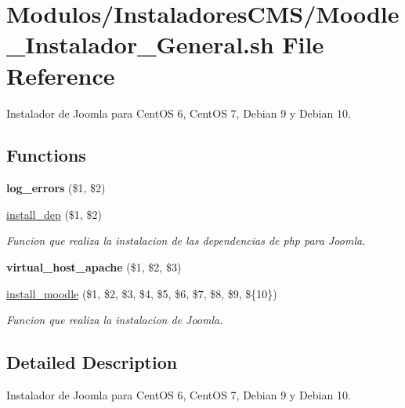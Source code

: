 \hypertarget{Moodle__Instalador__General_8sh}{}\section{Modulos/\+Instaladores\+C\+M\+S/\+Moodle\+\_\+\+Instalador\+\_\+\+General.sh File Reference}
\label{Moodle__Instalador__General_8sh}


Instalador de Joomla para Cent\+OS 6, Cent\+OS 7, Debian 9 y Debian 10.  


\subsection*{Functions}
\begin{DoxyCompactItemize}
\item 
\mbox{\label{Moodle__Instalador__General_8sh_a92067b58a8478c9841b2cd9b75ea3565}} 
{\bfseries log\+\_\+errors} (\$1, \$2)
\item 
\hyperlink{Moodle__Instalador__General_8sh_a7aff02becf631a8cd3f06f1fc2688670}{install\+\_\+dep} (\$1, \$2)
\begin{DoxyCompactList}\small\item\em Funcion que realiza la instalacion de las dependencias de php para Joomla. \end{DoxyCompactList}\item 
\mbox{\label{Moodle__Instalador__General_8sh_a2ea632f8e04de9564521b12cf10c47f4}} 
{\bfseries virtual\+\_\+host\+\_\+apache} (\$1, \$2, \$3)
\item 
\hyperlink{Moodle__Instalador__General_8sh_ac4e3fbb1b121107ddd781ab2fe3d034a}{install\+\_\+moodle} (\$1, \$2, \$3, \$4, \$5, \$6, \$7, \$8, \$9, \$\{10\})
\begin{DoxyCompactList}\small\item\em Funcion que realiza la instalacion de Joomla. \end{DoxyCompactList}\end{DoxyCompactItemize}


\subsection{Detailed Description}
Instalador de Joomla para Cent\+OS 6, Cent\+OS 7, Debian 9 y Debian 10. 

